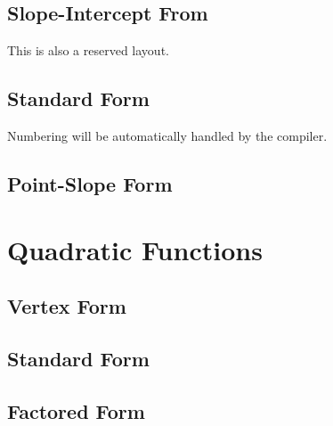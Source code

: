 \documentclass[11pt]{article}
\begin{document}
	\subsection{Slope-Intercept From}
	This is also a reserved layout.
	\subsection{Standard Form}
	Numbering will be automatically handled by the compiler.
	\subsection{Point-Slope Form}
\section{Quadratic Functions}
	\subsection{Vertex Form}
	\subsection{Standard Form}
	\subsection{Factored Form}
\end{document}
